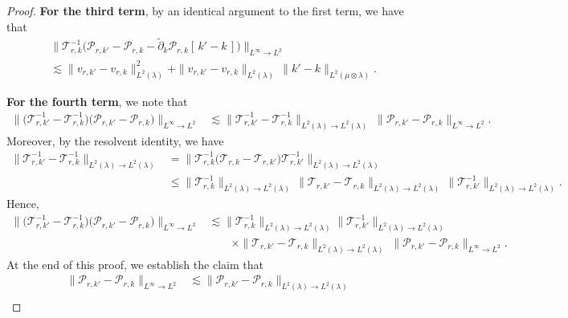 \documentclass[11pt]{article}
\newcommand{\adk}{\widetilde{\partial}_k}
\theoremstyle{plain}
\begin{document}
\begin{proof}
\noindent \textbf{For the third term}, by an identical argument to the first term, we have that
\begin{align*}
  &\big\| \mathcal{T}_{r,k}^{-1}\Big(\mathcal{P}_{r,k'} - \mathcal{P}_{r,k} 
      - \adk \mathcal{P}_{r,k}[\,k' - k\,]\Big) 
   \big\|_{L^\infty \rightarrow L^2} \\
  &\lesssim \|v_{r,k'} - v_{r,k}\|_{L^2(\lambda)}^2
          + \|v_{r,k'} - v_{r,k}\|_{L^2(\lambda)}\,
            \|k' - k\|_{L^2(\mu \otimes \lambda)}.
\end{align*}



\noindent \textbf{For the fourth term}, we note that
\begin{align*}
   \big\|\big(\mathcal{T}_{r,k'}^{-1} - \mathcal{T}_{r,k}^{-1}\big)
       \big(\mathcal{P}_{r,k'} - \mathcal{P}_{r,k}\big)\big\|_{L^\infty \to L^2} 
   &\lesssim  \|\mathcal{T}_{r,k'}^{-1} - \mathcal{T}_{r,k}^{-1} \|_{L^2(\lambda) \to L^2(\lambda)}\;
       \|\mathcal{P}_{r,k'} - \mathcal{P}_{r,k}\|_{L^\infty \to L^2}.
\end{align*}
Moreover, by the resolvent identity, we have
\[
\begin{aligned}
\|\mathcal{T}_{r,k'}^{-1} - \mathcal{T}_{r,k}^{-1}\|_{L^2(\lambda) \to L^2(\lambda)}
&= \|\mathcal{T}_{r,k}^{-1}\big(\mathcal{T}_{r,k} - \mathcal{T}_{r,k'}\big)\mathcal{T}_{r,k'}^{-1}\|_{L^2(\lambda) \to L^2(\lambda)} \\
&\le \|\mathcal{T}_{r,k}^{-1}\|_{L^2(\lambda) \to L^2(\lambda)}\,
\|\mathcal{T}_{r,k'} - \mathcal{T}_{r,k}\|_{L^2(\lambda) \to L^2(\lambda)}\,
\|\mathcal{T}_{r,k'}^{-1}\|_{L^2(\lambda) \to L^2(\lambda)}.
\end{aligned}
\]
Hence,
\begin{align*}
   \big\|\big(\mathcal{T}_{r,k'}^{-1} - \mathcal{T}_{r,k}^{-1}\big)
       \big(\mathcal{P}_{r,k'} - \mathcal{P}_{r,k}\big)\big\|_{L^\infty \to L^2} 
   &\lesssim  \|\mathcal{T}_{r,k}^{-1}\|_{L^2(\lambda) \to L^2(\lambda)}
       \|\mathcal{T}_{r,k'}^{-1}\|_{L^2(\lambda) \to L^2(\lambda)} \\
   &\qquad \times \|\mathcal{T}_{r,k'} - \mathcal{T}_{r,k} \|_{L^2(\lambda) \to L^2(\lambda)}\;
       \|\mathcal{P}_{r,k'} - \mathcal{P}_{r,k}\|_{L^\infty \to L^2}.
\end{align*}
At the end of this proof, we establish the claim that
\[
\begin{aligned}
\|\mathcal{P}_{r,k'}-\mathcal{P}_{r,k}\|_{L^\infty\to L^2}
&\lesssim \|\mathcal{P}_{r,k'}-\mathcal{P}_{r,k}\|_{L^2(\lambda)\to L^2(\lambda)} \\

\end{aligned}\]
\end{proof}
\end{document}
